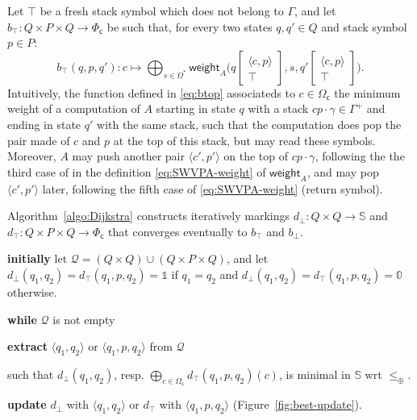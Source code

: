 \documentclass[runningheads]{llncs}
\def\<#1>{\langle #1 \rangle}
\newcommand{\configup}[2]{\ensuremath{#1}\left[\begin{array}{c} #2 \end{array}\right]}
\def\stackup{\\}
\newcommand{\Q}{\mathcal{Q}}
\newcommand{\Semiring}{\mathbb{S}}
\newcommand{\zero}{\mathbb{0}}
\newcommand{\one}{\mathbb{1}}
\def\SWVPA{\textsf{sw-VPA}\xspace}
\def\weight{\mathsf{weight}}
\def\Omegac{{\Omega_\mathsf{c}}}
\def\Phic{{\Phi_\mathsf{c}}}
\begin{document}
%
\noindent
Let $\top$ be a fresh stack symbol which does not belong to $\Gamma$,
and let $b_\top : Q \times P \times Q \to \Phic$ be such that,
for every two states $q, q' \in Q$ 
and stack symbol $p \in P$: %
\begin{equation}\label{eq:btop}
  b_\top(q, p, q') : c \mapsto \bigoplus_{s\in \Omega^*} 
  \textstyle
  \weight_A\bigl(\configup{q}{\< c, p> \stackup \top }, s, \configup{q'}{\<c, p> \stackup \top}\bigr). 
\end{equation}
%
Intuitively, the function defined in \eqref{eq:btop}
associateds to $c \in \Omegac$ 
the minimum weight of a computation of $A$
starting in state $q$ with a stack 
$c p \cdot \gamma \in \Gamma^+$ 
and ending in state $q'$ with the same stack,
such that the computation does pop 
the pair made of $c$ and $p$ at the top of this stack,
but may read these symbols.
Moreover, $A$ may push another pair $\< c', p'>$ %
on the top of $c p \cdot \gamma$,
following the the third case of 
in the definition \eqref{eq:SWVPA-weight} of $\weight_A$,
and may pop $\< c', p'>$ later, following the fifth case of \eqref{eq:SWVPA-weight} (return symbol). 

Algorithm~\ref{algo:Dijkstra}
constructs iteratively markings 
$d_\bot : Q \times Q \to \Semiring$ and 
$d_\top : Q \times P \times Q \to \Phic$
that converges eventually to $b_\top$ and $b_\bot$.


\begin{algo}[best search for \SWVPA]\label{algo:Dijkstra}
\textbf{initially} 
let $\Q = (Q \times Q) \cup (Q \times P \times Q)$, %
and let 
$d_\bot(q_1, q_2) = d_\top(q_1, p, q_2) = \one$ if $q_1 = q_2$ and
$d_\bot(q_1, q_2) = d_\top(q_1, p, q_2) = \zero$ otherwise.

\smallskip\noindent
\textbf{while} $\Q$ is not empty

\noindent\quad
\textbf{extract} $\< q_1, q_2>$ or $\< q_1, p, q_2>$ from $\Q$ 

\noindent\quad
such that $d_\bot(q_1, q_2)$, resp. $\bigoplus_{c\in \Omegac} d_\top(q_1, p, q_2)(c)$,
is minimal in $\Semiring$ wrt $\leq_\oplus$.

\noindent\quad 
\textbf{update} $d_\bot$ with $\< q_1, q_2>$ or $d_\top$ with $\< q_1, p, q_2>$
(Figure~\ref{fig:best-update}).
\end{algo}
\end{document}
